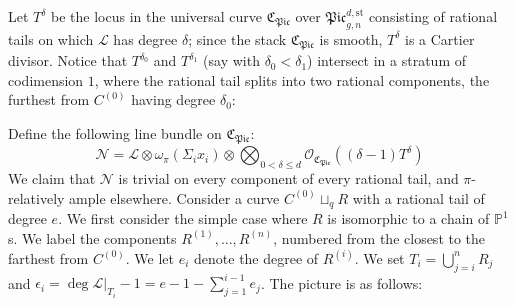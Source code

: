 \documentclass[11pt]{amsart}
\newcommand{\PP}{\mathbb P}
\theoremstyle{definition}
\theoremstyle{definition}
\begin{document}
Let $T^{\delta}$ be the locus in the universal curve $\mathfrak{C}_{\mathfrak{Pic}}$ over $\mathfrak{Pic}_{g,n}^{d,\text{st}}$ consisting of rational tails on which $\mathcal L$ has degree $\delta$; since the stack $\mathfrak{C}_{\mathfrak{Pic}}$ is smooth, $T^{\delta}$ is a Cartier divisor. Notice that $T^{\delta_0}$ and $T^{\delta_1}$ (say with $\delta_0<\delta_1$) intersect in a stratum of codimension $1$, where the rational tail splits into two rational components, the furthest from $C^{(0)}$ having degree $\delta_0$:

\begin{center}
\end{center}
\medskip

Define the following line bundle on $\mathfrak{C}_{\mathfrak{Pic}}$:
\begin{equation*} \mathcal N=\mathcal L\otimes\omega_{\pi}(\Sigma_i x_i)\otimes\bigotimes_{0<\delta\leq d}\mathcal O_{\mathfrak{C}_{\mathfrak{Pic}}}((\delta-1) T^\delta) \end{equation*}
We claim that $\mathcal{N}$ is trivial on every component of every rational tail, and $\pi$-relatively ample elsewhere. Consider a curve $C^{(0)}\sqcup_q R$ with a rational tail of degree $e$. We first consider the simple case where $R$ is isomorphic to a chain of $\PP^1$s. We label the components $R^{(1)},\ldots,R^{(n)}$, numbered from the closest to the farthest from $C^{(0)}$. We let $e_i$ denote the degree of $R^{(i)}$. We set $T_i=\bigcup_{j=i}^n R_j$ and $\epsilon_i=\deg \mathcal{L}|_{T_i} - 1 = e-1-\sum_{j=1}^{i-1} e_j$. The picture is as follows:
\end{document}
